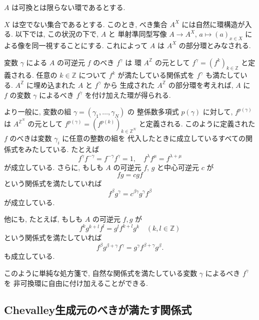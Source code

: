 \documentclass[12pt,twoside,dvipdfm]{msjproc}
\newcommand\Z{{\mathbb Z}} %
\theoremstyle{definition} %
\theoremstyle{definition} %
\theoremstyle{definition} %
\numberwithin{theorem}{section}
\numberwithin{equation}{section}
\numberwithin{figure}{section}
\numberwithin{table}{section}
\begin{document}
$A$ は可換とは限らない環であるとする.

$X$ は空でない集合であるとする.
このとき, べき集合 $A^X$ には自然に環構造が入る.
以下では, この状況の下で, $A$ と
単射準同型写像 $A\to A^X$, $a\mapsto (a)_{x\in X}$ による像を同一視することにする.
これによって $A$ は $A^X$ の部分環とみなされる.

変数 $\gamma$ による $A$ の可逆元 $f$ のべき $f^\gamma$ は
環 $A^\Z$ の元として $f^\gamma = (f^k)_{k\in\Z}$ と定義される.
任意の $k\in\Z$ について $f^k$ が満たしている関係式を $f^\gamma$ 
も満たしている.  $A^\Z$ に埋め込まれた $A$ と $f^\gamma$ から
生成された $A^\Z$ の部分環を考えれば, $A$ に $f$ の変数 $\gamma$ 
によるべき $f^\gamma$ を付け加えた環が得られる.

より一般に, 変数の組 $\gamma=(\gamma_1,\ldots,\gamma_N)$ の
整係数多項式 $p(\gamma)$ に対して,  $f^{p(\gamma)}$ は
$A^{\Z^N}$ の元として \(
  f^{p(\gamma)}
  = \left(f^{p(k)}\right)_{k\in\Z^N}
\) と定義される. 
このように定義された $f$ のべきは変数 $\gamma_i$ に任意の整数の組を
代入したときに成立しているすべての関係式をみたしている. 
たとえば
\begin{equation*}
 f^\gamma f^{-\gamma} = f^{-\gamma}f^\gamma = 1,  \quad
 f^\lambda f^\mu = f^{\lambda+\mu}
\end{equation*}
が成立している. さらに, もしも $A$ の可逆元 $f$, $g$ と中心可逆元 $c$ が
\begin{equation*}
 f g = c g f
\end{equation*} 
という関係式を満たしていれば
\begin{equation*}
 f^\beta g^\gamma = c^{\beta\gamma} g^\gamma f^\beta
\end{equation*}
が成立している. 

他にも, たとえば, もしも $A$ の可逆元 $f,g$ が
\begin{equation*}
　f^k g^{k+l} f^l = g^l f^{k+l} g^k
  \quad (k,l\in\Z)
\end{equation*}
という関係式を満たしていれば
\begin{equation*}
  f^\beta g^{\beta+\gamma} f^\gamma
 =g^\gamma f^{\beta+\gamma} g^\beta.
\end{equation*}
も成立している. 

このように単純な処方箋で, 
自然な関係式を満たしている変数 $\gamma$ によるべき $f^\gamma$ を
非可換環に自由に付け加えることができる.




\subsection{Chevalley生成元のべきが満たす関係式}
\label{sec:powers2}
\end{document}
